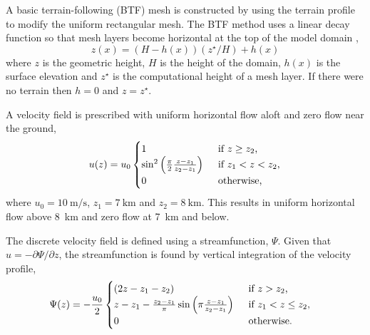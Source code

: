 A basic terrain-following (BTF) mesh is constructed by using the terrain profile to modify the uniform rectangular mesh.
The BTF method uses a linear decay function so that mesh layers become horizontal at the top of the model domain \citep{galchen-somerville1975a},
\begin{equation}
	z(x) = \left( H - h(x) \right) \left( z^\star / H \right) + h(x) \label{eqn:btf}
\end{equation}
where $z$ is the geometric height, $H$ is the height of the domain, $h(x)$ is the surface elevation and $z^\star$ is the computational height of a mesh layer.  If there were no terrain then $h = 0$ and $z = z^\star$.

A velocity field is prescribed with uniform horizontal flow aloft and zero flow near the ground,
\begin{align}
	u(z) = u_0 \begin{cases}
		1 & \enskip \text{if $z \geq z_2$,} \\
		\sin^2 \left( \frac{\pi}{2} \frac{z - z_1}{z_2 - z_1} \right) & \enskip \text{if $z_1 < z < z_2$,} \\
		0 & \enskip \text{otherwise,}
	\end{cases}
	\label{eqn:cubicFit:schaerAdvect:velocity}
\end{align}
where $u_0 = \SI{10}{\meter\per\second}$, $z_1 = \SI{7}{\kilo\meter}$ and $z_2 = \SI{8}{\kilo\meter}$.
This results in uniform horizontal flow above \SI{8}{\kilo\meter} and zero flow at \SI{7}{\kilo\meter} and below.

The discrete velocity field is defined using a streamfunction, \(\Psi\).  Given that \(u = -\partial \Psi / \partial z\), the streamfunction is found by vertical integration of the velocity profile,
\begin{align}
	\Psi(z) &= -\frac{u_0}{2}
	\begin{cases}
		\left( 2z - z_1 - z_2 \right) & \enskip \text{if $z > z_2$,} \\
		z - z_1 - \frac{z_2 - z_1}{\pi} \sin \left(\pi \frac{z - z_1}{z_2-z_1}\right) & \enskip \text{if $z_1 < z \leq z_2$,} \\
		0 & \enskip \text{otherwise.}
	\end{cases}
\end{align}

